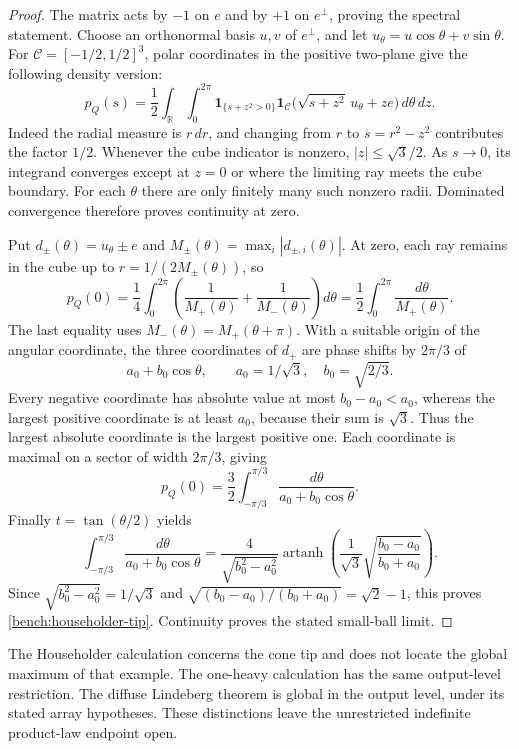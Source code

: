 \begin{proof}
The matrix acts by \(-1\) on \(e\) and by \(+1\) on
\(e^\perp\), proving the spectral statement.  Choose an orthonormal
basis \(u,v\) of \(e^\perp\), and let
\(u_\theta=u\cos\theta+v\sin\theta\).
For \(\mathcal C=[-1/2,1/2]^3\), polar coordinates in the positive
two-plane give the following density version:
\[
 p_Q(s)=\frac12\int_{\mathbb R}\int_0^{2\pi}
  \mathbf1_{\{s+z^2>0\}}
  \mathbf1_{\mathcal C}\bigl(\sqrt{s+z^2}\,u_\theta+ze\bigr)
                                                   \,d\theta\,dz.
\]
Indeed the radial measure is \(r\,dr\), and changing from
\(r\) to \(s=r^2-z^2\) contributes the factor \(1/2\).
Whenever the cube indicator is nonzero, \(|z|\leq\sqrt3/2\).
As \(s\to0\), its integrand converges except at \(z=0\) or
where the limiting ray meets the cube boundary.  For each \(\theta\)
there are only finitely many such nonzero radii.  Dominated convergence
therefore proves continuity at zero.

Put \(d_\pm(\theta)=u_\theta\pm e\) and
\(M_\pm(\theta)=\max_i|d_{\pm,i}(\theta)|\).
At zero, each ray remains in the cube up to
\(r=1/(2M_\pm(\theta))\), so
\[
 p_Q(0)=\frac14\int_0^{2\pi}
        \left(\frac1{M_+(\theta)}+\frac1{M_-(\theta)}\right)d\theta
       =\frac12\int_0^{2\pi}\frac{d\theta}{M_+(\theta)}.
\]
The last equality uses
\(M_-(\theta)=M_+(\theta+\pi)\).
With a suitable origin of the angular coordinate, the three
coordinates of \(d_+\) are phase shifts by \(2\pi/3\) of
\[
 a_0+b_0\cos\theta,\qquad
 a_0=1/\sqrt3,\quad b_0=\sqrt{2/3}.
\]
Every negative coordinate has absolute value at most
\(b_0-a_0<a_0\), whereas the largest positive coordinate is at
least \(a_0\), because their sum is \(\sqrt3\).
Thus the largest absolute coordinate is the largest positive one.
Each coordinate is maximal on a sector of width \(2\pi/3\), giving
\[
 p_Q(0)=\frac32\int_{-\pi/3}^{\pi/3}
                    \frac{d\theta}{a_0+b_0\cos\theta}.
\]
Finally \(t=\tan(\theta/2)\) yields
\[
 \int_{-\pi/3}^{\pi/3}\frac{d\theta}{a_0+b_0\cos\theta}
 =\frac4{\sqrt{b_0^2-a_0^2}}
   \operatorname{artanh}\left(
      \frac1{\sqrt3}\sqrt{\frac{b_0-a_0}{b_0+a_0}}\right).
\]
Since \(\sqrt{b_0^2-a_0^2}=1/\sqrt3\) and
\(\sqrt{(b_0-a_0)/(b_0+a_0)}=\sqrt2-1\), this proves
\eqref{bench:householder-tip}.  Continuity proves the stated
small-ball limit.
\end{proof}

The Householder calculation concerns the cone tip and does not locate
the global maximum of that example.  The one-heavy calculation has the
same output-level restriction.  The diffuse Lindeberg theorem is global
in the output level, under its stated array hypotheses.  These distinctions
leave the unrestricted indefinite product-law endpoint open.
